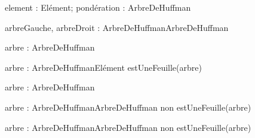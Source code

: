 \begin{algorithme}
	
	{element : Elément; pondération : \naturel}{ArbreDeHuffman}

	{arbreGauche, arbreDroit : ArbreDeHuffman}{ArbreDeHuffman}

	{arbre : ArbreDeHuffman}{\naturel}

	{arbre : ArbreDeHuffman}{Elément}
	{estUneFeuille(arbre)}

	{arbre : ArbreDeHuffman}{\booleen}

	{arbre : ArbreDeHuffman}{ArbreDeHuffman}
	{non estUneFeuille(arbre)}
	
	{arbre : ArbreDeHuffman}{ArbreDeHuffman}
	{non estUneFeuille(arbre)}

\end{algorithme}

